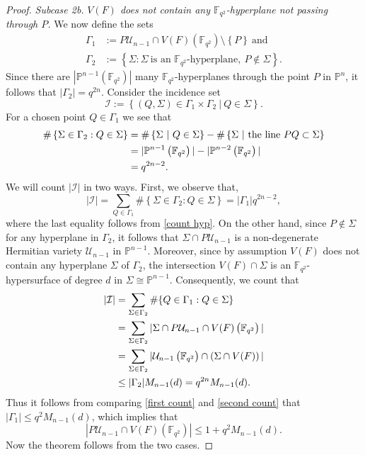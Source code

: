 \documentclass[10pt,a4paper]{amsart}
\newcommand{\Fqt}{\mathbb{F}_{q^2}}
\newcommand{\I}{\mathcal{I}}
\def\PP{{\mathbb P}}
\newcommand{\U}{\mathcal{U}}
\begin{document}
\begin{proof}
        \textit{Subcase 2b.} \textit{$V(F)$ does not contain any $\Fqt$-hyperplane not passing through $P$.} We now define the sets 
        \begin{align*}
            \Gamma_1 &:=P\U_{n-1}\cap V(F)(\Fqt)\setminus \left\{P\right\} \ \text{and}\\
            \Gamma_2 &:= \left\{\Sigma: \Sigma \ \text{is an $\Fqt$-hyperplane},\ P\notin \Sigma \right\}.
        \end{align*}
Since there are $|\PP^{n-1}(\Fqt)|$ many $\Fqt$-hyperplanes through the point $P$ in $\PP^n$, it follows that $|\Gamma_2|=q^{2n}$. Consider the incidence set $$\I:=\left\{\left(Q,\Sigma\right)\in \Gamma_1\times \Gamma_2 \ | \ Q\in \Sigma  \right\}.$$ For a chosen point $Q\in \Gamma_1$ we see that 
\begin{align}
\#\left\{ \Sigma\in \Gamma_2: Q\in \Sigma \right\} &= \#\left\{ \Sigma\ |\  Q\in \Sigma \right\}-\#\left\{ \Sigma\ |\ \text{the line}\  PQ\subset \Sigma   \right\}\notag\\
         &=|\PP^{n-1}\left(\Fqt\right)|- |\PP^{n-2}\left(\Fqt\right)|\notag \\
         &=q^{2n-2}\label{count hyp}.
\end{align}
We will count $|\I|$ in two ways. First, we observe that, 
\begin{equation}\label{first count}
  |\I|=\sum_{Q\in \Gamma_1}\#\left\{ \Sigma\in\Gamma_2: Q\in \Sigma \right\}=|\Gamma_1|q^{2n-2},  
\end{equation}
where the last equality follows from \eqref{count hyp}. On the other hand, since $P\notin \Sigma$ for any hyperplane in $\Gamma_2$, it follows that $\Sigma\cap P\U_{n-1}$ is a non-degenerate Hermitian variety $\U_{n-1}$ in $\PP^{n-1}$. Moreover, since by assumption $V(F)$ does not contain any hyperplane $\Sigma$ of $\Gamma_2$, the intersection $V(F)\cap \Sigma$ is an $\Fqt$-hypersurface of degree $d$ in $\Sigma\cong\PP^{n-1}$. Consequently, we count that 
\begin{align}
    |\I|&=\sum_{\Sigma\in \Gamma_2}\#\{ Q\in \Gamma_1: Q\in \Sigma \}\notag\\
        &= \sum_{\Sigma\in \Gamma_2} |\Sigma\cap P\U_{n-1}\cap V(F)\left(\Fqt\right)| \notag\\
        &=\sum_{\Sigma\in \Gamma_2}|\U_{n-1}\left(\Fqt\right)\cap \left(\Sigma\cap V(F)  \right)|\notag\\
        &\leq |\Gamma_2| M_{n-1}(d)=q^{2n}M_{n-1}(d).\label{second count}
\end{align}
Thus it follows from comparing \eqref{first count} and \eqref{second count} that $|\Gamma_1|\leq q^2 M_{n-1}(d)$, which implies that $$|P\U_{n-1}\cap V(F)(\Fqt)|\leq 1+q^2M_{n-1}(d).$$ Now the theorem follows from the two cases.
\end{proof}
\end{document}
